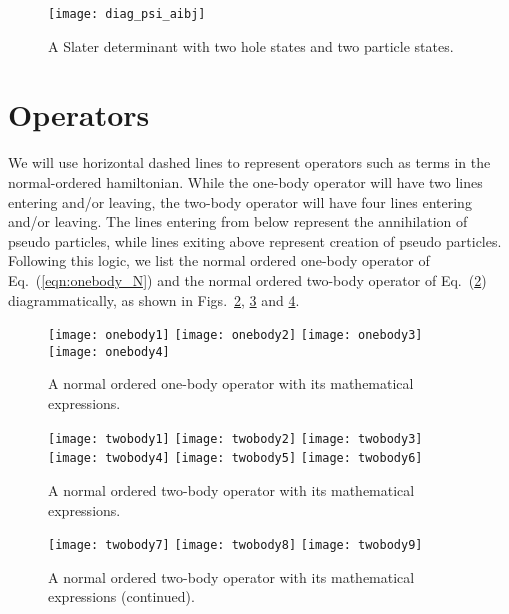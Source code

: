 \begin{figure}[hbtp]
    \centering
    \texttt{[image: diag\_psi\_aibj]}
    \caption{A Slater determinant with two hole states and two particle states.}
    \label{fig:diag_psi_aibj}
\end{figure}

\FloatBarrier

\section{Operators}

We will use horizontal dashed lines to represent operators such as
terms in the normal-ordered hamiltonian. While the one-body operator
will have two lines entering and/or leaving, the two-body operator
will have four lines entering and/or leaving. The lines entering from
below represent the annihilation of pseudo particles, while lines
exiting above represent creation of pseudo particles. Following this
logic, we list the normal ordered one-body operator  of Eq.~(\ref{eqn:onebody_N}) 
and the normal ordered two-body operator
of Eq.~(\ref{fig:onebody}) diagrammatically, as shown in Figs.~\ref{fig:onebody},
\ref{fig:twobody1} and \ref{fig:twobody2}.
\begin{figure}[hbtp]
    \centering
    \texttt{[image: onebody1]}
    \texttt{[image: onebody2]}
    \texttt{[image: onebody3]}
    \texttt{[image: onebody4]}
    \caption{A normal ordered one-body operator with its mathematical expressions.}
    \label{fig:onebody}
\end{figure}

\begin{figure}[hbtp]
    \centering
    \texttt{[image: twobody1]}
    \texttt{[image: twobody2]}
    \texttt{[image: twobody3]}
    \texttt{[image: twobody4]}
    \texttt{[image: twobody5]}
    \texttt{[image: twobody6]}
    \caption{A normal ordered two-body operator with its mathematical expressions.}
    \label{fig:twobody1}
\end{figure}

\begin{figure}[hbtp]
    \centering
    \texttt{[image: twobody7]}
    \texttt{[image: twobody8]}
    \texttt{[image: twobody9]}
    \caption{A normal ordered two-body operator with its mathematical expressions (continued).}
    \label{fig:twobody2}
\end{figure}

